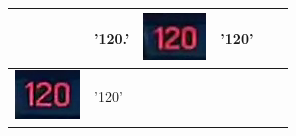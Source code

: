 \begin{table}[h!]
\begin{tabular}{| c | l | c | l | c | l |}
\begin{minipage}{.2\textwidth}
    \end{minipage}
    &
    '120.'
    &
    \begin{minipage}{.2\textwidth}
      \includegraphics[width=\textwidth]{img/exp_number_04}
    \end{minipage}
    &
    '120'
    \\
    \hline
    \begin{minipage}{.2\textwidth}
      \includegraphics[width=\textwidth]{img/exp_number_05}
    \end{minipage}
    &
    '120'
    &
    \begin{minipage}{.2\textwidth}

\end{minipage}
\end{tabular}
\end{table}
